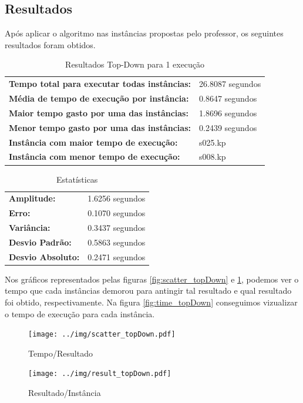 \documentclass[a4paper, 12pt]{article}
\begin{document}
\subsection{Resultados}

Após aplicar o algoritmo  nas instâncias propostas pelo professor, os seguintes resultados
foram obtidos.
\begin{table}[!htb]
    \begin{tabular}{ll}
    \textbf{Tempo total para executar todas instâncias:} & 26.8087 segundos \\
    \textbf{Média de tempo de execução por instância:} & 0.8647 segundos \\
    \textbf{Maior tempo gasto por uma das instâncias:} & 1.8696 segundos \\
    \textbf{Menor tempo gasto por uma das instâncias:} & 0.2439 segundos \\
    \textbf{Instância com maior tempo de execução:} & s025.kp \\
    \textbf{Instância com menor tempo de execução:} & s008.kp
    \end{tabular}
    \caption{Resultados Top-Down para 1 execução}
    \label{tab:topdown_exec}
\end{table}
\begin{table}[!htb]
    \begin{tabular}{ll}
    \textbf{Amplitude:} & 1.6256 segundos \\
    \textbf{Erro:} & 0.1070 segundos \\
    \textbf{Variância:} & 0.3437 segundos \\
    \textbf{Desvio Padrão:} & 0.5863 segundos \\
    \textbf{Desvio Absoluto:} & 0.2471 segundos
    \end{tabular}
    \caption{Estatísticas}
    \label{tab:estatistica_topdown}
\end{table}

\newpage
Nos gráficos representados pelas figuras \ref{fig:scatter_topDown} e \ref{fig:result_topDown}, podemos ver o tempo
que cada instâncias demorou para antingir tal resultado e qual resultado foi obtido, respectivamente. 
Na figura \ref{fig:time_topDown} conseguimos vizualizar o tempo de execução para cada instância.
\begin{figure}[!htb]
    \centering
    \begin{minipage}{0.55\textwidth}
        \centering
        \texttt{[image: ../img/scatter\_topDown.pdf]}
        \caption{Tempo/Resultado}
        \label{fig:scatter_topDown}
    \end{minipage}%
    \begin{minipage}{0.55\textwidth}
        \centering
        \texttt{[image: ../img/result\_topDown.pdf]}
        \caption{Resultado/Instância}
        \label{fig:result_topDown}
    \end{minipage}
\end{figure}
\end{document}
